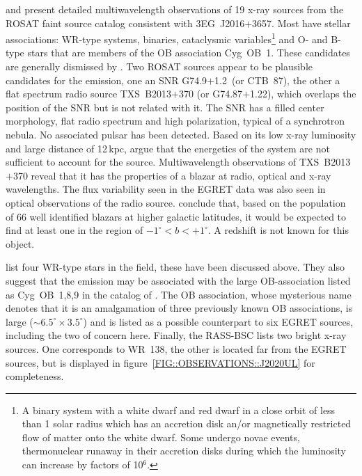 \citet{REF::MUKHERJEE::APJ2000} and \citet{REF::HALPERN::APJ2001::2016}
present detailed multiwavelength observations of 19 x-ray sources from
the ROSAT faint source catalog consistent with 3EG~J2016$+$3657. Most
have stellar associations: WR-type systems, binaries, cataclysmic
variables\footnote{A binary system with a white dwarf and red dwarf in
a close orbit of less than 1 solar radius which has an accretion disk
an/or magnetically restricted flow of matter onto the white dwarf.
Some undergo novae events, thermonuclear runaway in their accretion
disks during which the luminosity can increase by factors of 10$^6$.} 
and O- and B-type stars that are members of the OB association
Cyg~OB~1. These candidates are generally dismissed by
\citet{REF::HALPERN::APJ2001::2016}. Two ROSAT sources appear to
be plausible candidates for the \Gray emission, one an SNR
G74.9$+$1.2~(or CTB~87), the other a flat spectrum radio source
TXS~B2013$+$370 (or G74.87$+$1.22), which overlaps the position of the
SNR but is not related with it. The SNR has a filled center
morphology, flat radio spectrum and high polarization, typical of a
synchrotron nebula. No associated pulsar has been detected. Based on
its low x-ray luminosity and large distance of 12\,kpc,
\citet{REF::HALPERN::APJ2001::2016} argue that the energetics of the
system are not sufficient to account for the \Gray
source. Multiwavelength observations of TXS~B2013$+$370
\citep{REF::MUKHERJEE::APJ2000} reveal that it has the properties
of a blazar at radio, optical and x-ray wavelengths. The flux
variability seen in the EGRET data was also seen in optical
observations of the radio source. \citet{REF::HALPERN::APJ2001::2016}
conclude that, based on the population of 66 well identified blazars
at higher galactic latitudes, it would be expected to find at least
one in the region of $-1^\circ<b<+1^\circ$. A redshift is not known
for this object.

\citet{REF::ROMERO::AA1999} list four WR-type stars in the field, these 
have been discussed above. They also suggest that the \Gray emission
may be associated with the large OB-association listed as Cyg~OB~1,8,9
in the catalog of \citet{REF::MELNIK::AL1995}. The OB association,
whose mysterious name denotes that it is an amalgamation of three
previously known OB associations, is large
($\sim6.5^\circ\times3.5^\circ$) and is listed as a possible
counterpart to six EGRET sources, including the two of concern here.
Finally, the RASS-BSC lists two bright x-ray sources. One corresponds
to WR~138, the other is located far from the EGRET sources, but is
displayed in figure~\ref{FIG::OBSERVATIONS::J2020UL} for completeness.

